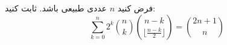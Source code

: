 \EXERCISE
فرض کنید
$n$
عددی طبیعی باشد. ثابت کنید:
$$\sum_{k=0}^{n} 2^k \binom{n}{k} \binom{n-k}{\lfloor \frac{n-k}{2} \rfloor} = \binom{2n + 1}{n}$$